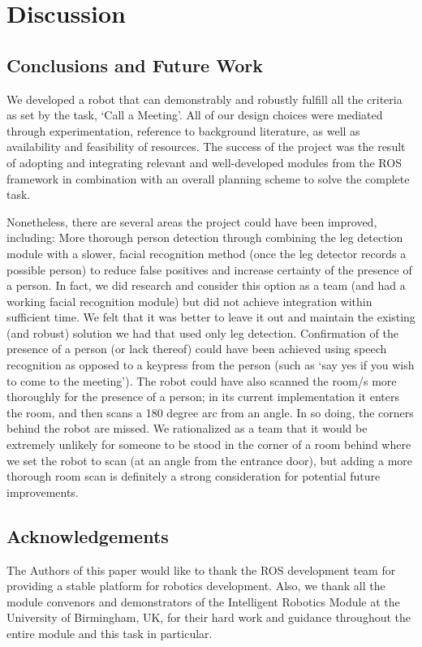 \documentclass{article}
\begin{document}
    \section{Discussion}
    \subsection{Conclusions and Future Work}
    We developed a robot that  can demonstrably and robustly fulfill all the criteria as set by the task, ‘Call a Meeting’. All of our design choices were mediated through experimentation, reference to background literature, as well as availability and feasibility of resources. The success of the project was the result of adopting and integrating relevant and well-developed modules from the ROS framework in combination with an overall planning scheme to solve the complete task.

	Nonetheless, there are several areas the project could have been improved, including:  More thorough person detection through combining the leg detection module with a slower, facial recognition method (once the leg detector records a possible person) to reduce false positives and increase certainty of the presence of a person. In fact, we did research and consider this option as a team (and had a working facial recognition module) but did not achieve integration within sufficient time. We felt that it was better to leave it out and maintain the existing (and robust) solution we had that used only leg detection. Confirmation of the presence of a person (or lack thereof) could have been achieved using speech recognition as opposed to a keypress from the person (such as ‘say yes if you wish to come to the meeting’). The robot could have also scanned the room/s more thoroughly for the presence of a person; in its current implementation it enters the room, and then scans a 180 degree arc from an angle. In so doing, the corners behind the robot are missed. We rationalized as a team that it would be extremely unlikely for someone to be stood in the corner of a room behind where we set the robot to scan (at an angle from the entrance door), but adding a more thorough room scan is definitely a strong consideration for potential future improvements.
	
	\subsection{Acknowledgements}
	The Authors of this paper would like to thank the ROS development team for providing a stable platform for robotics development. Also, we thank all the module convenors and demonstrators of the Intelligent Robotics Module at the University of Birmingham, UK, for their hard work and guidance throughout the entire module and this task in particular.

    
\end{document}
